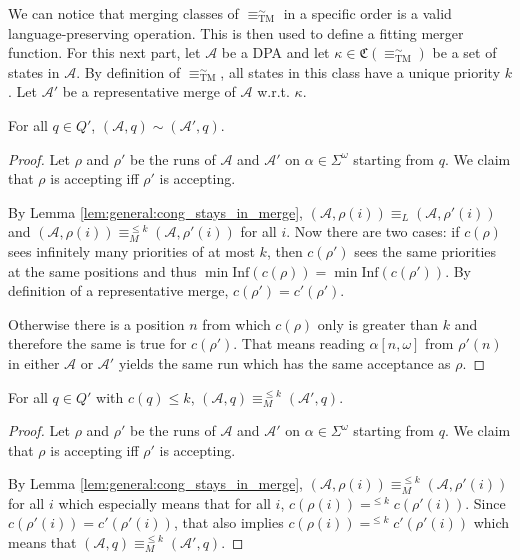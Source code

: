 \newpage



\vspace{25pt}

We can notice that merging classes of $\equiv_\text{TM}^\sim$ in a specific order is a valid language-preserving operation. This is then used to define a fitting merger function. For this next part, let $\mathcal{A}$ be a DPA and let $\kappa \in \mathfrak{C}(\equiv^\sim_\text{TM})$ be a set of states in $\mathcal{A}$. By definition of $\equiv^\sim_\text{TM}$, all states in this class have a unique priority $k$. Let $\mathcal{A}'$ be a representative merge of $\mathcal{A}$ w.r.t. $\kappa$.

\begin{lem}
	For all $q \in Q'$, $(\mathcal{A}, q) \sim (\mathcal{A}', q)$.
	\label{lem:tremoore:merge_keep_sim}
\end{lem}

\begin{proof} 
	Let $\rho$ and $\rho'$ be the runs of $\mathcal{A}$ and $\mathcal{A}'$ on $\alpha \in \Sigma^\omega$ starting from $q$. We claim that $\rho$ is accepting iff $\rho'$ is accepting.
	
	By Lemma \ref{lem:general:cong_stays_in_merge}, $(\mathcal{A}, \rho(i)) \equiv_L (\mathcal{A}, \rho'(i))$ and $(\mathcal{A}, \rho(i)) \equiv_M^{\leq k} (\mathcal{A}, \rho'(i))$ for all $i$. Now there are two cases: if $c(\rho)$ sees infinitely many priorities of at most $k$, then $c(\rho')$ sees the same priorities at the same positions and thus $\min \text{Inf}(c(\rho)) = \min \text{Inf}(c(\rho'))$. By definition of a representative merge, $c(\rho') = c'(\rho')$.
	
	 Otherwise there is a position $n$ from which $c(\rho)$ only is greater than $k$ and therefore the same is true for $c(\rho')$. That means reading $\alpha[n,\omega]$ from $\rho'(n)$ in either $\mathcal{A}$ or $\mathcal{A}'$ yields the same run which has the same acceptance as $\rho$.
\end{proof}

\begin{lem}
	For all $q \in Q'$ with $c(q) \leq k$, $(\mathcal{A}, q) \equiv_M^{\leq k} (\mathcal{A}', q)$.
	\label{lem:tremoore:merge_keep_tmoore}
\end{lem}

\begin{proof} 
	Let $\rho$ and $\rho'$ be the runs of $\mathcal{A}$ and $\mathcal{A}'$ on $\alpha \in \Sigma^\omega$ starting from $q$. We claim that $\rho$ is accepting iff $\rho'$ is accepting.
	
	By Lemma \ref{lem:general:cong_stays_in_merge}, $(\mathcal{A}, \rho(i)) \equiv_M^{\leq k} (\mathcal{A}, \rho'(i))$ for all $i$ which especially means that for all $i$, $c(\rho(i)) =^{\leq k} c(\rho'(i))$. Since $c(\rho'(i)) = c'(\rho'(i))$, that also implies $c(\rho(i)) =^{\leq k} c'(\rho'(i))$ which means that $(\mathcal{A}, q) \equiv_M^{\leq k} (\mathcal{A}', q)$.
\end{proof}

